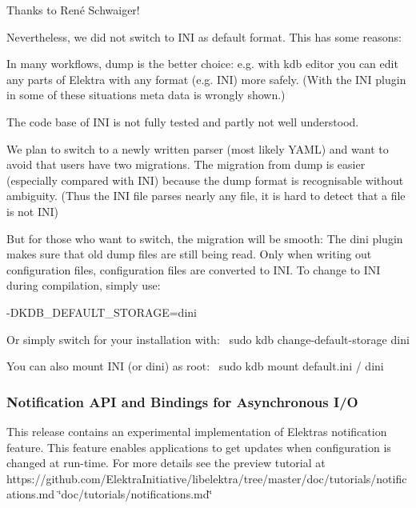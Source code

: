 Thanks to René Schwaiger!

Nevertheless, we did not switch to I\+NI as default format. This has some reasons\+:


\begin{DoxyItemize}
\item In many workflows, {\ttfamily dump} is the better choice\+: e.\+g. with {\ttfamily kdb editor} you can edit any parts of Elektra with any format (e.\+g. I\+NI) more safely. (With the I\+NI plugin in some of these situations meta data is wrongly shown.)
\item The code base of I\+NI is not fully tested and partly not well understood.
\item We plan to switch to a newly written parser (most likely Y\+A\+ML) and want to avoid that users have two migrations. The migration from {\ttfamily dump} is easier (especially compared with I\+NI) because the {\ttfamily dump} format is recognisable without ambiguity. (Thus the I\+NI file parses nearly any file, it is hard to detect that a file is not I\+NI)
\end{DoxyItemize}

But for those who want to switch, the migration will be smooth\+: The {\ttfamily dini} plugin makes sure that old dump files are still being read. Only when writing out configuration files, configuration files are converted to I\+NI. To change to I\+NI during compilation, simply use\+:

{\ttfamily -\/\+D\+K\+D\+B\+\_\+\+D\+E\+F\+A\+U\+L\+T\+\_\+\+S\+T\+O\+R\+A\+GE=dini}

Or simply switch for your installation with\+:~\newline
 {\ttfamily sudo kdb change-\/default-\/storage dini}

You can also mount I\+NI (or dini) as root\+:~\newline
 {\ttfamily sudo kdb mount default.\+ini / dini}

\subsubsection*{Notification A\+PI and Bindings for Asynchronous I/O}

This release contains an experimental implementation of Elektra\textquotesingle{}s notification feature. This feature enables applications to get updates when configuration is changed at run-\/time. For more details see the preview tutorial at https\+://github.com/\+Elektra\+Initiative/libelektra/tree/master/doc/tutorials/notifications.\+md \char`\"{}doc/tutorials/notifications.\+md\char`\"{}

